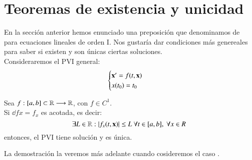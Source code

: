 \section{Teoremas de existencia y unicidad}
En la sección anterior hemos enunciado una preposición que denominamos de  para ecuaciones lineales de orden I. Nos gustaría dar condiciones más genereales para saber si existen y son únicas ciertas soluciones.\\
Consideraremos el PVI general:
$$
    \begin{cases}
        \mathbf{x'} = f(t, \mathbf{x}) \\ x(t_0) = t_0
    \end{cases}
$$
\begin{thm}
    Sea $f: [a,b] \subset \mathbb{R} \longrightarrow \mathbb{R}$, con $f \in C^1$.\\Si $\dd{f}{x} = f_x$ es acotada,  es decir:
    $$
        \exists L \in \mathbb{R} : |f_x(t, \mathbf{x})| \leq L\ \forall t\in[a,b],\ \forall x\in R
    $$ entonces, el PVI tiene solución y es única.
\end{thm}
La demostración la veremos más adelante cuando cosideremos el caso .

